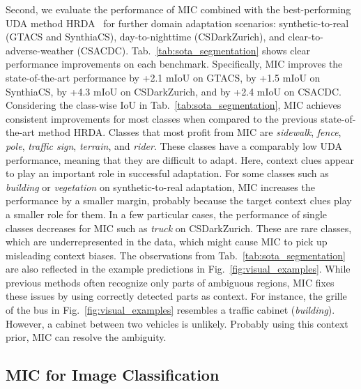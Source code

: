 \documentclass[10pt,twocolumn,letterpaper]{article}
\begin{document}
Second, we evaluate the performance of MIC combined with the best-performing UDA method HRDA~\cite{hoyer2022hrda} for further domain adaptation scenarios: synthetic-to-real (GTA\allowbreak CS and Synthia\allowbreak CS), day-to-nighttime (CSDarkZurich), and clear-to-adverse-weather (CS\allowbreak ACDC). Tab.~\ref{tab:sota_segmentation} shows clear performance improvements on each benchmark. Specifically, MIC improves the state-of-the-art performance by +2.1 mIoU on GTACS, by +1.5 mIoU on SynthiaCS, by +4.3 mIoU on CS\allowbreak DarkZurich, and by +2.4 mIoU on CS\allowbreak ACDC. 
Considering the class-wise IoU in Tab.~\ref{tab:sota_segmentation}, MIC achieves consistent improvements for most classes when compared to the previous state-of-the-art method HRDA. Classes that most profit from MIC are \emph{sidewalk}, \emph{fence}, \emph{pole}, \emph{traffic sign}, \emph{terrain}, and \emph{rider}. These classes have a comparably low UDA performance, meaning that they are difficult to adapt. Here, context clues appear to play an important role in successful adaptation.
For some classes such as \emph{building} or \emph{vegetation} on synthetic-to-real adaptation, MIC increases the performance by a smaller margin, probably because the target context clues play a smaller role for them.
In a few particular cases, the performance of single classes decreases for MIC such as \emph{truck} on CSDarkZurich. These are rare classes, which are underrepresented in the data, which might cause MIC to pick up misleading context biases.
The observations from Tab.~\ref{tab:sota_segmentation} are also reflected in the example predictions in Fig.~\ref{fig:visual_examples}. 
While previous methods often recognize only parts of ambiguous regions, MIC fixes these issues by using correctly detected parts as context. For instance, the grille of the bus in Fig.~\ref{fig:visual_examples} resembles a traffic cabinet (\emph{building}).
However, a cabinet between two vehicles is unlikely. 
Probably using this context prior, MIC can resolve the ambiguity.


\subsection{MIC for Image Classification}
\label{sec:exp_classification}
\end{document}
